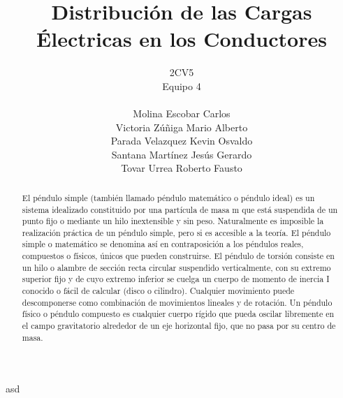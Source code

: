 \documentclass[11pt]{article}
\title{Distribución de las Cargas Électricas en los Conductores}
\author{2CV5\\Equipo 4\\\\Molina Escobar Carlos\\Victoria Zúñiga Mario Alberto\\Parada Velazquez Kevin Osvaldo\\Santana Martínez Jesús Gerardo\\Tovar Urrea Roberto Fausto}
\date{}
\begin{document}
\begin{abstract}
	El péndulo simple (también llamado péndulo matemático o péndulo ideal) es un sistema idealizado constituido por una partícula de masa m que está suspendida de un punto fijo o mediante un hilo inextensible y sin peso. Naturalmente es imposible la realización práctica de un péndulo simple, pero si es accesible a la teoría. El péndulo simple o matemático se denomina así en contraposición a los péndulos reales, compuestos o físicos, únicos que pueden construirse. El péndulo de torsión consiste en un hilo o alambre de sección recta circular suspendido verticalmente, con su extremo superior fijo y de cuyo extremo inferior se cuelga un cuerpo de momento de inercia I conocido o fácil de calcular (disco o cilindro). Cualquier movimiento puede descomponerse como combinación de movimientos lineales y de rotación. Un péndulo físico o péndulo compuesto es cualquier cuerpo rígido que pueda oscilar libremente en el campo gravitatorio alrededor de un eje horizontal fijo, que no pasa por su centro de masa.
\end{abstract}


\begin{multicols}{2}
asd
\end{multicols}
\end{document}
